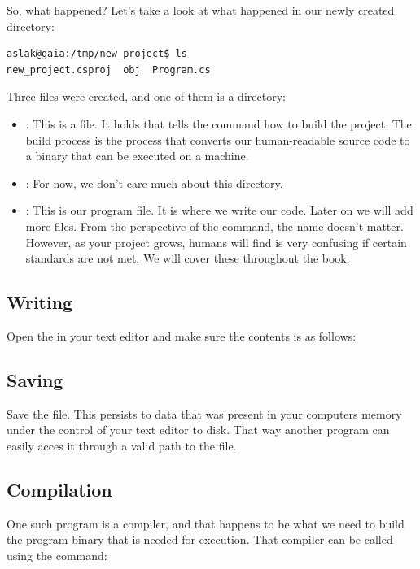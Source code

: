 So, what happened? Let's take a look at what happened in our newly created directory:

\begin{verbatim}
aslak@gaia:/tmp/new_project$ ls
new_project.csproj  obj  Program.cs
\end{verbatim}

Three files were created, and one of them is a directory:
\begin{itemize}
  \item {}: This is a  file. It holds  that tells the  command how to build the project. The build process is the process that converts our human-readable source code to a binary that can be executed on a machine.
  \item {}: For now, we don't care much about this directory.
  \item {}: This is our program file. It is where we write our code. Later on we will add more files. From the perspective of the  command, the name doesn't matter. However, as your project grows, humans will find is very confusing if certain standards are not met. We will cover these throughout the book.
\end{itemize}

\subsection{Writing}
\label{first:writing}

Open the  in your text editor and make sure the contents is as follows:


\subsection{Saving}

Save the file. This persists to data that was present in your computers memory under the control of your text editor to disk. That way another program can easily acces it through a valid path to the file.

\subsection{Compilation}

One such program is a compiler, and that happens to be what we need to build the program binary that is needed for execution. That compiler can be called using the  command:


